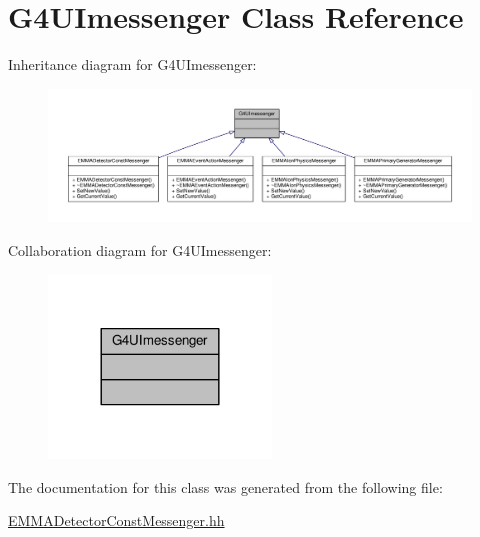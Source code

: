 \hypertarget{classG4UImessenger}{}\section{G4\+U\+Imessenger Class Reference}
\label{classG4UImessenger}


Inheritance diagram for G4\+U\+Imessenger\+:
\nopagebreak
\begin{figure}[H]
\begin{center}
\leavevmode
\includegraphics[width=350pt]{classG4UImessenger__inherit__graph}
\end{center}
\end{figure}


Collaboration diagram for G4\+U\+Imessenger\+:
\nopagebreak
\begin{figure}[H]
\begin{center}
\leavevmode
\includegraphics[width=168pt]{classG4UImessenger__coll__graph}
\end{center}
\end{figure}


The documentation for this class was generated from the following file\+:\begin{DoxyCompactItemize}
\item 
\hyperlink{EMMADetectorConstMessenger_8hh}{E\+M\+M\+A\+Detector\+Const\+Messenger.\+hh}\end{DoxyCompactItemize}
